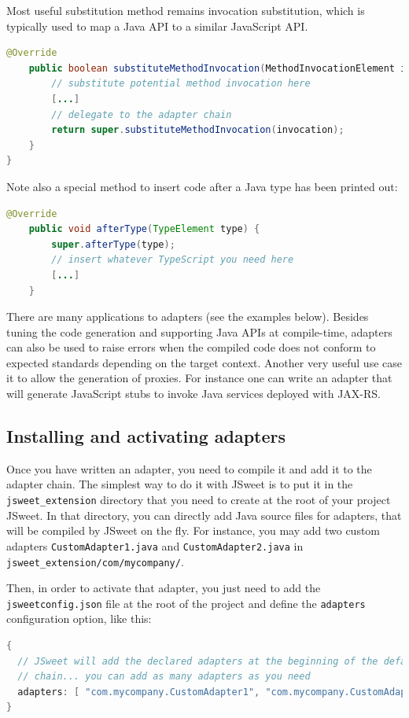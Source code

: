 \documentclass[a4paper]{report}
\begin{document}
Most useful substitution method remains invocation substitution, which is typically used to map a Java API to a similar JavaScript API.

\begin{lstlisting}[language=Java]
	@Override
	public boolean substituteMethodInvocation(MethodInvocationElement invocation) {
		// substitute potential method invocation here
		[...]
		// delegate to the adapter chain
		return super.substituteMethodInvocation(invocation);
	}
}
\end{lstlisting}

Note also a special method to insert code after a Java type has been printed out:

\begin{lstlisting}[language=Java]
	@Override
	public void afterType(TypeElement type) {
		super.afterType(type);
		// insert whatever TypeScript you need here		
		[...]
	}
\end{lstlisting}

There are many applications to adapters (see the examples below). Besides tuning the code generation and supporting Java APIs at compile-time, adapters can also be used to raise errors when the compiled code does not conform to expected standards depending on the target context. Another very useful use case it to allow the generation of proxies. For instance one can write an adapter that will generate JavaScript stubs to invoke Java services deployed with JAX-RS.

\subsection{Installing and activating adapters}

Once you have written an adapter, you need to compile it and add it to the adapter chain. The simplest way to do it with JSweet is to put it in the \texttt{jsweet\_extension} directory that you need to create at the root of your project JSweet. In that directory, you can directly add Java source files for adapters, that will be compiled by JSweet on the fly. For instance, you may add two custom adapters \texttt{CustomAdapter1.java} and \texttt{CustomAdapter2.java} in \texttt{jsweet\_extension/com/mycompany/}.

Then, in order to activate that adapter, you just need to add the \texttt{jsweetconfig.json} file at the root of the project and define the \texttt{adapters} configuration option, like this:

\begin{lstlisting}[language=Java]
{
  // JSweet will add the declared adapters at the beginning of the default 
  // chain... you can add as many adapters as you need
  adapters: [ "com.mycompany.CustomAdapter1", "com.mycompany.CustomAdapter2" ]
}
\end{lstlisting}
\end{document}
